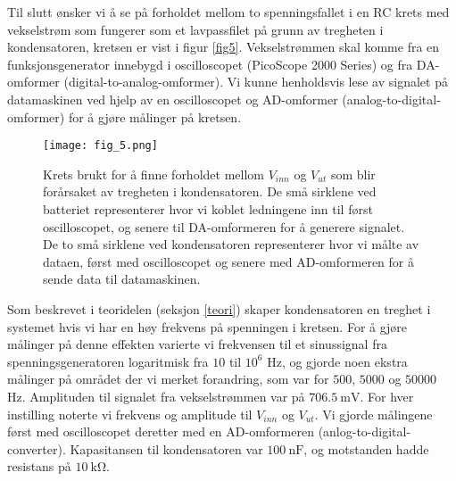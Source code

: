 \documentclass[%
 reprint,
 amsmath,amssymb,
 aps,
]{revtex4-1}
\begin{document}
Til slutt ønsker vi å se på forholdet mellom to spenningsfallet i en RC krets med vekselstrøm som fungerer som et lavpassfilet på grunn av tregheten i kondensatoren, kretsen er vist i figur \vref{fig5}. Vekselstrømmen skal komme fra en funksjonsgenerator innebygd i oscilloscopet (PicoScope 2000 Series) og fra DA-omformer (digital-to-analog-omformer). Vi kunne henholdsvis lese av signalet på datamaskinen ved hjelp av en oscilloscopet og AD-omformer (analog-to-digital-omformer) for å gjøre målinger på kretsen.
\begin{figure}[h!]
  \centering
  \texttt{[image: fig\_5.png]}
  \caption{Krets brukt for å finne forholdet mellom $V_{inn}$ og $V_{ut}$ som blir forårsaket av tregheten i kondensatoren. De små sirklene ved batteriet representerer hvor vi koblet ledningene inn til først oscilloscopet, og senere til DA-omformeren for å generere signalet. De to små sirklene ved kondensatoren representerer hvor vi målte av dataen, først med oscilloscopet og senere med AD-omformeren for å sende data til datamaskinen.}
  \label{fig5}
\end{figure}
Som beskrevet i teoridelen (seksjon \vref{teori}) skaper kondensatoren en treghet i systemet hvis vi har en høy frekvens på spenningen i kretsen. For å gjøre målinger på denne effekten varierte vi frekvensen til et sinussignal fra spenningsgeneratoren logaritmisk fra $10$ til $10^6$ Hz, og gjorde noen ekstra målinger på området der vi merket forandring, som var for $500$, $5000$ og $50000$ Hz. Amplituden til signalet fra vekselstrømmen var på $\SI{706.5}{\milli \volt}$. For hver instilling noterte vi frekvens og amplitude til $V_{inn}$ og $V_{ut}$. Vi gjorde målingene først med oscilloscopet deretter med en AD-omformeren (anlog-to-digital-converter). Kapasitansen til kondensatoren var $\SI{100}{\nano\farad}$, og motstanden hadde resistans på $\SI{10}{\kilo\ohm}$.
\end{document}

